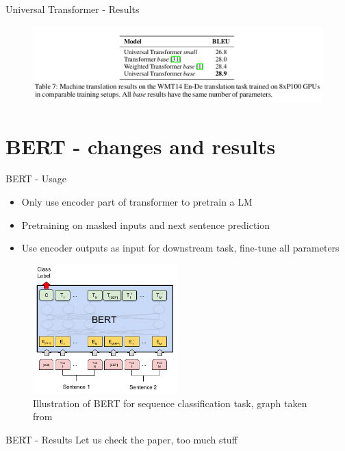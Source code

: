 \documentclass{beamer}
\begin{document}
\begin{frame}{Universal Transformer - Results}
\begin{figure}[t]
	\includegraphics[width=\textwidth]{figures/uni-results.png}
\end{figure}
\end{frame}

\section{BERT - changes and results}
\begin{frame}{BERT - Usage}
\begin{itemize}
	\item Only use encoder part of transformer to pretrain a LM
	\item Pretraining on masked inputs and next sentence prediction
	\item Use encoder outputs as input for downstream task, fine-tune all parameters
\end{itemize}
\begin{figure}[t]
	\includegraphics[width=0.5\textwidth]{figures/bert.png}
	\caption{Illustration of BERT for sequence classification task, graph taken from \cite{devlin_bert:_2018}}
\end{figure}
\end{frame}

\begin{frame}{BERT - Results}
Let us check the paper, too much stuff
\end{frame}
\end{document}
